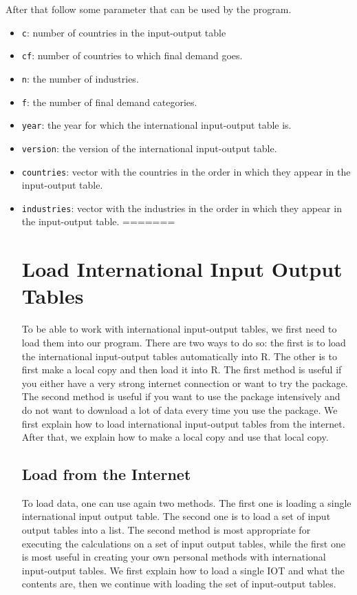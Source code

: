 \documentclass[10pt,a4paper]{paper}
\begin{document}
	After that follow some parameter that can be used by the program.
	\begin{itemize}
		\item \texttt{c}: number of countries in the input-output table
		\item \texttt{cf}: number of countries to which final demand goes.
		\item \texttt{n}: the number of industries. 
		\item \texttt{f}: the number of final demand categories. 
		\item \texttt{year}: the year for which the international input-output table is.
		\item \texttt{version}: the version of the international input-output table.
		\item \texttt{countries}: vector with the countries in the order in which they appear in the input-output table.
		\item \texttt{industries}: vector with the industries in the order in which they appear in the input-output table.
=======
	\section{Load International Input Output Tables}
	
	To be able to work with international input-output tables, we first need to load them into our program. There are two ways to do so: the first is to load the international input-output tables automatically into R. The other is to first make a local copy and then load it into R. The first method is useful if you either have a very strong internet connection or want to try the package. The second method is useful if you want to use the package intensively and do not want to download a lot of data every time you use the package. We first explain how to load international input-output tables from the internet. After that, we explain how to make a local copy and use that local copy.
	
	\subsection{Load from the Internet}
	
	To load data, one can use again two methods. The first one is loading a single international input output table. The second one is to load a set of input output tables into a list. The second method is most appropriate for executing the calculations on a set of input output tables, while the first one is most useful in creating your own personal methods with international input-output tables. We first explain how to load a single IOT and what the contents are, then we continue with loading the set of input-output tables. 
	

\end{itemize}
\end{document}
